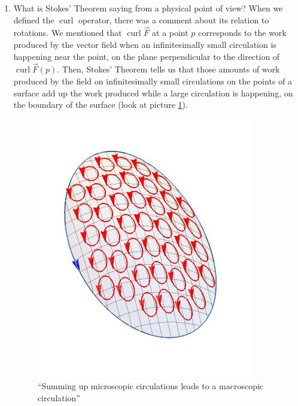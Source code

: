 \documentclass[12pt]{article}
\newcommand{\vF}{\vec{F}}
\DeclareMathOperator{\curl}{curl}
\begin{document}
\begin{enumerate}
\item What is Stokes' Theorem saying from a physical point of view? When we defined the $\curl $ operator, there was a comment about its relation to rotations. We mentioned that $\curl\vF$ at a point $p$ corresponds to the work produced by the vector field when an infinitesimally small circulation is happening near the point, on the plane perpendicular to the direction of $\curl\vF(p)$. Then, Stokes' Theorem tells us that those amounts of work produced by the field on infinitesimally small circulations on the points of a surface add up the work produced while a large circulation is happening, on the boundary of the surface (look at picture \ref{figr}). 
\begin{figure}[h]
\begin{center}
\includegraphics[scale=.6]{circulation.jpeg}
\caption{``Summing up microscopic circulations leads to a macroscopic circulation''}
\label{figr}
\end{center}
\end{figure}


\end{enumerate}
\end{document}
